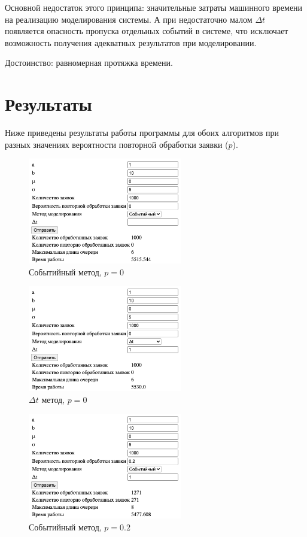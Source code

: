 Основной недостаток этого принципа: значительные затраты машинного времени на реализацию моделирования системы. А при недостаточно малом $\Delta t$ появляется опасность пропуска отдельных событий в системе, что исключает возможность получения адекватных результатов при моделировании.

Достоинство: равномерная протяжка времени.

\section{Результаты}

Ниже приведены результаты работы программы для обоих алгоритмов при разных значениях вероятности повторной обработки заявки ($p$).

\begin{figure}[H]
    \centering
    \includegraphics[width=0.6\textwidth]{img/content/event_0.png}
    \caption{Событийный метод, $p = 0$}
\end{figure}

\begin{figure}[H]
    \centering
    \includegraphics[width=0.6\textwidth]{img/content/dt_0.png}
    \caption{$\Delta t$ метод, $p = 0$}
\end{figure}

\begin{figure}[H]
    \centering
    \includegraphics[width=0.6\textwidth]{img/content/event_2.png}
    \caption{Событийный метод, $p = 0.2$}
\end{figure}

